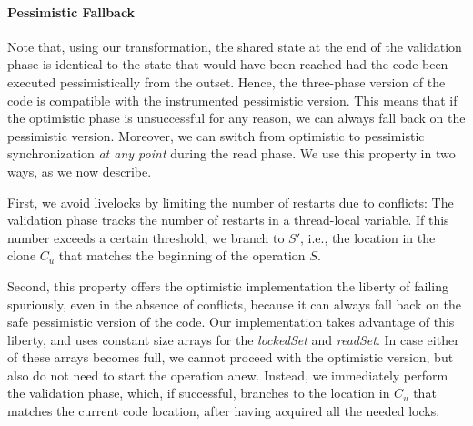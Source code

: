\paragraph{Pessimistic Fallback}
Note that, using our transformation, the shared state at the end of the validation phase
is identical to the state that would have been reached had the code been executed pessimistically from
the outset. Hence, the three-phase version of the code is compatible with the instrumented
pessimistic version. This means that if the optimistic phase is unsuccessful for any reason, we can always
fall back on the pessimistic version. Moreover, we can switch from optimistic to pessimistic synchronization 
\emph{at any point} during the read phase.
We use this property in two ways, as we now describe.

First, we avoid livelocks by limiting the number of restarts due to conflicts: 
The validation phase tracks the number of restarts in a thread-local variable. 
If this number exceeds a certain threshold, we branch to $S'$, i.e., the location in the clone $C_u$ that matches 
the beginning of the operation $S$. 

Second, this property offers the optimistic implementation the liberty of 
failing spuriously, even in the absence of conflicts, because it can always fall back on the safe pessimistic version
of the code. Our implementation
takes advantage of this liberty, and uses constant size arrays for the \emph{lockedSet} and \emph{readSet}. 
In case either of these arrays becomes full, we cannot proceed with the optimistic version, but also
do not need to start the operation anew. 
Instead, we immediately perform the validation phase, which, if successful, branches to the location in $C_u$
that matches the current code location, after having acquired all the needed locks. 
